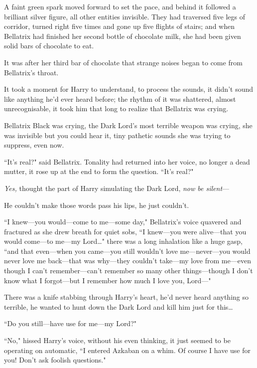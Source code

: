 
\lettrine{A}{} faint green spark moved forward to set the pace, and behind it followed a brilliant silver figure, all other entities invisible. They had traversed five legs of corridor, turned right five times and gone up five flights of stairs; and when Bellatrix had finished her second bottle of chocolate milk, she had been given solid bars of chocolate to eat.

It was after her third bar of chocolate that strange noises began to come from Bellatrix's throat.

It took a moment for Harry to understand, to process the sounds, it didn't sound like anything he'd ever heard before; the rhythm of it was shattered, almost unrecognisable, it took him that long to realize that Bellatrix was crying.

Bellatrix Black was crying, the Dark Lord's most terrible weapon was crying, she was invisible but you could hear it, tiny pathetic sounds she was trying to suppress, even now.

``It's real?" said Bellatrix. Tonality had returned into her voice, no longer a dead mutter, it rose up at the end to form the question. ``It's real?"

\emph{Yes,} thought the part of Harry simulating the Dark Lord, \emph{now be silent}—

He couldn't make those words pass his lips, he just couldn't.

``I knew—you would—come to me—some day," Bellatrix's voice quavered and fractured as she drew breath for quiet sobs, ``I knew—you were alive—that you would come—to me—my Lord…" there was a long inhalation like a huge gasp, ``and that even—when you came—you still wouldn't love me—never—you would never love me back—that was why—they couldn't take—my love from me—even though I can't remember—can't remember so many other things—though I don't know what I forgot—but I remember how much I love you, Lord—"

There was a knife stabbing through Harry's heart, he'd never heard anything so terrible, he wanted to hunt down the Dark Lord and kill him just for this…

``Do you still—have use for me—my Lord?"

``No," hissed Harry's voice, without his even thinking, it just seemed to be operating on automatic, ``I entered Azkaban on a whim. Of course I have use for you! Don't ask foolish questions."

